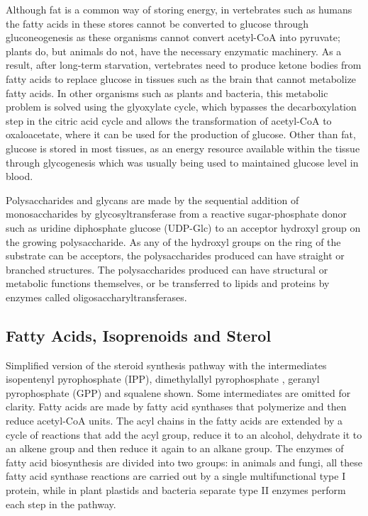 Although fat is a common way of storing energy, in vertebrates such as humans the fatty acids in these stores cannot be converted to glucose through gluconeogenesis as these organisms cannot convert acetyl-CoA into pyruvate; plants do, but animals do not, have the necessary enzymatic machinery. As a result, after long-term starvation, vertebrates need to produce ketone bodies from fatty acids to replace glucose in tissues such as the brain that cannot metabolize fatty acids. In other organisms such as plants and bacteria, this metabolic problem is solved using the glyoxylate cycle, which bypasses the decarboxylation step in the citric acid cycle and allows the transformation of acetyl-CoA to oxaloacetate, where it can be used for the production of glucose. Other than fat, glucose is stored in most tissues, as an energy resource available within the tissue through glycogenesis which was usually being used to maintained glucose level in blood.

Polysaccharides and glycans are made by the sequential addition of monosaccharides by glycosyltransferase from a reactive sugar-phosphate donor such as uridine diphosphate glucose (UDP-Glc) to an acceptor hydroxyl group on the growing polysaccharide. As any of the hydroxyl groups on the ring of the substrate can be acceptors, the polysaccharides produced can have straight or branched structures. The polysaccharides produced can have structural or metabolic functions themselves, or be transferred to lipids and proteins by enzymes called oligosaccharyltransferases.

\hypertarget{fatty-acids-isoprenoids-and-sterol}{%
\subsection{Fatty Acids, Isoprenoids and Sterol}\label{fatty-acids-isoprenoids-and-sterol}}

Simplified version of the steroid synthesis pathway with the intermediates isopentenyl pyrophosphate (IPP), dimethylallyl pyrophosphate , geranyl pyrophosphate (GPP) and squalene shown. Some intermediates are omitted for clarity.
Fatty acids are made by fatty acid synthases that polymerize and then reduce acetyl-CoA units. The acyl chains in the fatty acids are extended by a cycle of reactions that add the acyl group, reduce it to an alcohol, dehydrate it to an alkene group and then reduce it again to an alkane group. The enzymes of fatty acid biosynthesis are divided into two groups: in animals and fungi, all these fatty acid synthase reactions are carried out by a single multifunctional type I protein, while in plant plastids and bacteria separate type II enzymes perform each step in the pathway.

